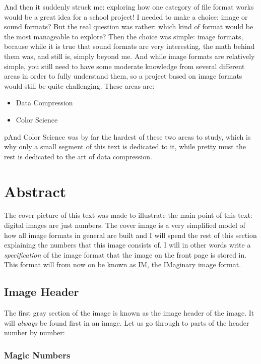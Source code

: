 And then it suddenly struck me: exploring how one category of file
format works would be a great idea for a school project! I needed to
make a choice: image or sound formats? But the real question was
rather: which kind of format would be the most manageable to explore?
Then the choice was simple: image formats, because while it is true
that sound formats are very interesting, the math behind them was, and
still is, simply beyond me. And while image formats are relatively
simple, you still need to have some moderate knowledge from several
different areas in order to fully understand them, so a project based
on image formats would still be quite challenging. These areas are:

\begin{itemize}
\item Data Compression
\item Color Science
\end{itemize}

pAnd Color Science was by far the hardest of these two areas to study,
which is why only a small segment of this text is dedicated to it,
while pretty must the rest is dedicated to the art of data
compression.

\section{Abstract}

The cover picture of this text was made to illustrate the main point
of this text: digital images are just numbers. The cover image is a
very simplified model of how all image formats in general are built
and I will spend the rest of this section explaining the numbers that
this image consists of. I will in other words write a
\textit{specification} of the image format that the image on the front
page is stored in. This format will from now on be known as IM, the
IMaginary image format.

\subsection{Image Header}

The first gray section of the image is known as the image header of
the image. It will \textit{always} be found first in an image. Let us
go through to parts of the header number by number:

\subsubsection{Magic Numbers}


